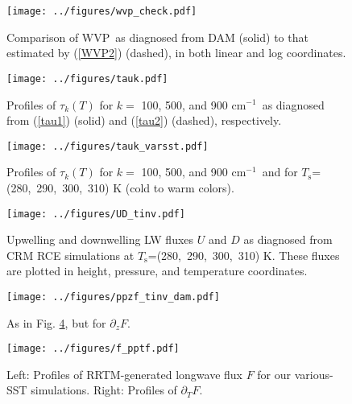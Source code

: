 \documentclass[10pt]{article}
\newcommand{\eqnref}[1]{(\ref{#1})}
\newcommand{\ppz}{\ensuremath{\partial_z}}
\newcommand{\ppt}{\ensuremath{\partial_T}}
\newcommand{\cminverse}{\ensuremath{\mathrm{cm^{-1}}}}
\newcommand{\Ts}{\ensuremath{T_\mathrm{s}}}
\newcommand{\WVP}{\ensuremath{\mathrm{WVP}}}
\begin{document}
\pagebreak

\begin{figure}[h]
	\begin{center}
			\texttt{[image: ../figures/wvp\_check.pdf]}
		\caption{Comparison of \WVP\ as diagnosed from DAM (solid) to that estimated by \eqnref{WVP2} (dashed), in both linear and log coordinates.
		\label{wvp_check}
		}
	\end{center}
\end{figure}

\begin{figure}[h]
	\begin{center}
			\texttt{[image: ../figures/tauk.pdf]}
		\caption{Profiles of $\tau_k(T)$ for $k=$ 100, 500, and 900 \cminverse\ as diagnosed from \eqnref{tau1} (solid) and \eqnref{tau2} (dashed), respectively.
		\label{tauk}
		}
	\end{center}
\end{figure}

\begin{figure}[h]
	\begin{center}
			\texttt{[image: ../figures/tauk\_varsst.pdf]}
		\caption{Profiles of $\tau_k(T)$ for $k=$ 100, 500, and 900 \cminverse\ and for \Ts=(280,\ 290,\ 300,\ 310) K (cold to warm colors).
		\label{tauk_varsst}
		}
	\end{center}
\end{figure}

\begin{figure}[h]
	\begin{center}
			\texttt{[image: ../figures/UD\_tinv.pdf]}
		\caption{Upwelling and downwelling LW fluxes $U$ and $D$  as diagnosed from CRM RCE simulations at \Ts=(280,\ 290,\ 300,\ 310) K. These fluxes are plotted in height, pressure, and temperature coordinates.
		\label{UD_tinv}
		}
	\end{center}
\end{figure}

\begin{figure}[h]
	\begin{center}
			\texttt{[image: ../figures/ppzf\_tinv\_dam.pdf]}
		\caption{As in Fig. \ref{UD_tinv}, but for $\ppz F$.
		\label{ppzf_tinv_dam}
		}
	\end{center}
\end{figure}

\begin{figure}[h]
	\begin{center}
			\texttt{[image: ../figures/f\_pptf.pdf]}
		\caption{Left: Profiles of RRTM-generated longwave flux $F$ for our various-SST simulations. Right: Profiles of $\ppt F$.
		\label{f_pptf}
		}
	\end{center}
\end{figure}
\end{document}
